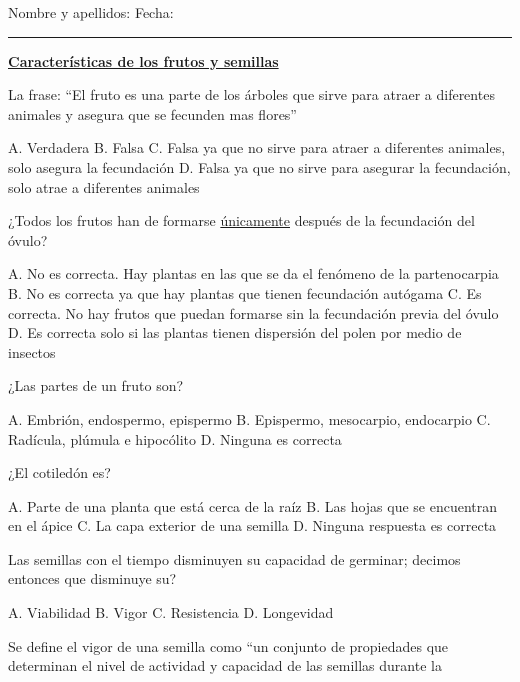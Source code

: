 \documentclass[11pt]{exam}
\newcommand\titexam[1]{\centering%
\fbox{\parbox{\textwidth}{\huge \sffamily \textbf{#1}}}\normalsize \vspace{1em}}
\newcommand\materia[1]{%
\parbox{\textwidth}{ \Large \sffamily \textbf{\uline{#1}}}\vspace{1em}}
\newcommand\nombrefecha{%
Nombre y apellidos:\hrulefill
Fecha:\rule{3.5cm}{0.4pt}\vspace{0.5em}}
\begin{document}
{\selectfont

\titexam{MF 1481. Producción de semillas}

\nombrefecha

\materia{Características de los frutos y semillas}
\begin{questions}
\question La frase: ``El fruto es una parte de los árboles que sirve para atraer
a diferentes animales y asegura que se fecunden mas flores''
\begin{checkboxes}
  \choice A. Verdadera
  \CorrectChoice B. Falsa
  \choice C. Falsa ya que no sirve para atraer a diferentes animales, solo
  asegura la fecundación
  \choice D. Falsa ya que no sirve para asegurar la fecundación, solo atrae a
  diferentes animales
\end{checkboxes}
\question ¿Todos los frutos han de formarse \uline{únicamente} después de la
fecundación del óvulo?
\begin{checkboxes}
  \CorrectChoice A. No es correcta. Hay plantas en las que se da el fenómeno de
  la partenocarpia
  \choice B. No es correcta ya que hay plantas que tienen fecundación autógama
  \choice C. Es correcta. No hay frutos que puedan formarse sin la fecundación
  previa del óvulo
  \choice D. Es correcta solo si las plantas tienen dispersión del polen por
  medio de insectos
\end{checkboxes}
\question ¿Las partes de un fruto son?
\begin{checkboxes}
  \choice A. Embrión, endospermo, epispermo
  \choice B. Epispermo, mesocarpio, endocarpio
  \choice C. Radícula, plúmula e hipocólito
  \CorrectChoice D. Ninguna es correcta
\end{checkboxes}
\question ¿El cotiledón es?
\begin{checkboxes}
  \choice A. Parte de una planta que está cerca de la raíz
  \choice B. Las hojas que se encuentran en el ápice
  \choice C. La capa exterior de una semilla
  \CorrectChoice D. Ninguna respuesta es correcta
\end{checkboxes}
\question Las semillas con el tiempo disminuyen su capacidad de germinar;
decimos entonces que disminuye su?
\begin{checkboxes}
  \CorrectChoice A. Viabilidad
  \choice B. Vigor
  \choice C. Resistencia
  \choice D. Longevidad
\end{checkboxes}
\newpage
\question Se define el vigor de una semilla como ``un conjunto de propiedades
que determinan el nivel de actividad y capacidad de las semillas durante la

\end{questions}}
\end{document}
